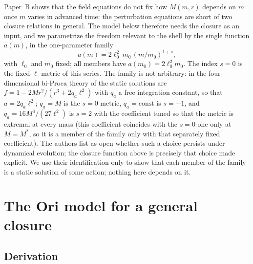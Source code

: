 \documentclass[11pt]{article}
\begin{document}
Paper~B \citep{PaperB} shows that the field equations do not fix how $M(m,r)$ depends on $m$ once $m$ varies in advanced time: the perturbation equations are short of two closure relations in general. The model below therefore needs the closure as an input, and we parametrize the freedom relevant to the shell by the single function $a(m)$, in the one-parameter family
\begin{equation}
a(m)=2\ell_0^2\,m_0\,(m/m_0)^{1+s},
\label{eq:family}
\end{equation}
with $\ell_0$ and $m_0$ fixed; all members have $a(m_0)=2\ell_0^2m_0$. The index $s=0$ is the fixed-$\ell$ metric of this series. The family is not arbitrary: in the four-dimensional bi-Proca theory of \citet{EichhornFernandes2025} the static solutions are $f=1-2Mr^2/(r^3+2q_a\ell^2)$ with $q_a$ a free integration constant, so that $a=2q_a\ell^2$; $q_a=M$ is the $s=0$ metric, $q_a=\mathrm{const}$ is $s=-1$, and $q_a=16M^3/(27\ell^2)$ is $s=2$ with the coefficient tuned so that the metric is extremal at every mass (this coefficient coincides with the $s=0$ one only at $M=M^*$, so it is a member of the family only with that separately fixed coefficient). The authors list as open whether such a choice persists under dynamical evolution; the closure function above is precisely that choice made explicit. We use their identification only to show that each member of the family is a static solution of some action; nothing here depends on it.

\section{The Ori model for a general closure}
\label{sec:model}

\subsection{Derivation}
\end{document}
